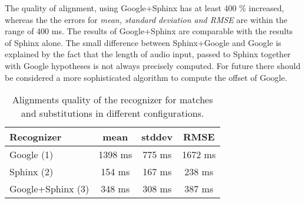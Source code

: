 The quality of alignment, using Google+Sphinx has at least 400 \% increased,
whereas the the errors for \textit {mean, standard deviation and RMSE} are within the range of
400 ms. The results of Google+Sphinx are comparable with the results of Sphinx
alone. The small difference between Sphinx+Google and Google is explained by the
fact that the length of audio input, passed to Sphinx together with Google
hypotheses is not always precisely computed. For future there should be
considered a more sophisticated algorithm to compute the offset of Google. 
\begin {table}
\label{tab:alignment_non_increm} 
\begin{center}
\caption {Alignments quality of the recognizer for matches and substitutions in
different configurations.}
    \begin{tabular}{l  c  c  c }
   \toprule
    Recognizer & mean & stddev & RMSE \\ \toprule
    Google (1)  & 1398 ms &  775 ms & 1672 ms \\ 
    Sphinx (2)  & 154 ms & 167 ms & 238 ms \\ 
    Google+Sphinx (3)  &  348  ms & 308 ms &  387 ms \\ 
    \bottomrule  
    \end{tabular}
\end{center}
\end {table}


